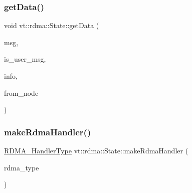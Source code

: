 \mbox{\label{structvt_1_1rdma_1_1_state_aff23d68ef3e0c30c6f2526bb50976148}} 
\subsubsection{\texorpdfstring{get\+Data()}{getData()}}
{\footnotesize\ttfamily void vt\+::rdma\+::\+State\+::get\+Data (\begin{DoxyParamCaption}\item[{\hyperlink{namespacevt_1_1rdma_acce0da4c9ea1233c3f132c1971943653}{Get\+Message} $\ast$}]{msg,  }\item[{bool const \&}]{is\+\_\+user\+\_\+msg,  }\item[{\hyperlink{structvt_1_1rdma_1_1_state_a6a78216795efe7fb6966c33b1a21d7cf}{R\+D\+M\+A\+\_\+\+Info\+Type} const \&}]{info,  }\item[{\hyperlink{namespacevt_a866da9d0efc19c0a1ce79e9e492f47e2}{Node\+Type} const \&}]{from\+\_\+node }\end{DoxyParamCaption})}

\mbox{\label{structvt_1_1rdma_1_1_state_ab82d3a9820bcee1238ab726ae79eb4e0}} 
\subsubsection{\texorpdfstring{make\+Rdma\+Handler()}{makeRdmaHandler()}}
{\footnotesize\ttfamily \hyperlink{namespacevt_a9530efb893c0f3846e8ac5f0507e0f49}{R\+D\+M\+A\+\_\+\+Handler\+Type} vt\+::rdma\+::\+State\+::make\+Rdma\+Handler (\begin{DoxyParamCaption}\item[{\hyperlink{namespacevt_1_1rdma_ac848e1d9da43db6294bd06f83e5d3946}{R\+D\+M\+A\+\_\+\+Type\+Type} const \&}]{rdma\+\_\+type }\end{DoxyParamCaption})}

\mbox{\label{structvt_1_1rdma_1_1_state_aa77318390a2d1afd1435d748971daa75}} 
